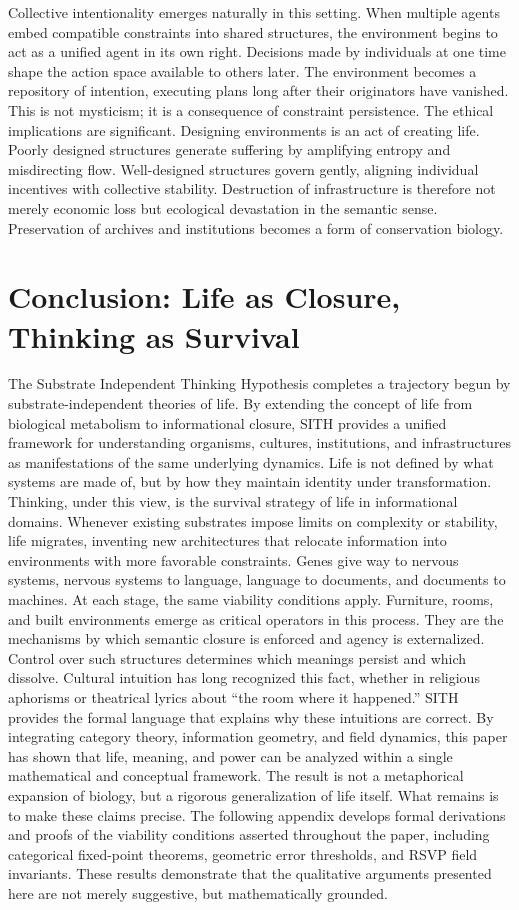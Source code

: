 \documentclass[11pt,oneside]{article}
\begin{document}
Collective intentionality emerges naturally in this setting. When multiple agents embed compatible constraints into shared structures, the environment begins to act as a unified agent in its own right. Decisions made by individuals at one time shape the action space available to others later. The environment becomes a repository of intention, executing plans long after their originators have vanished. This is not mysticism; it is a consequence of constraint persistence.
The ethical implications are significant. Designing environments is an act of creating life. Poorly designed structures generate suffering by amplifying entropy and misdirecting flow. Well-designed structures govern gently, aligning individual incentives with collective stability. Destruction of infrastructure is therefore not merely economic loss but ecological devastation in the semantic sense. Preservation of archives and institutions becomes a form of conservation biology.

\section{Conclusion: Life as Closure, Thinking as Survival}

The Substrate Independent Thinking Hypothesis completes a trajectory begun by substrate-independent theories of life. By extending the concept of life from biological metabolism to informational closure, SITH provides a unified framework for understanding organisms, cultures, institutions, and infrastructures as manifestations of the same underlying dynamics. Life is not defined by what systems are made of, but by how they maintain identity under transformation.
Thinking, under this view, is the survival strategy of life in informational domains. Whenever existing substrates impose limits on complexity or stability, life migrates, inventing new architectures that relocate information into environments with more favorable constraints. Genes give way to nervous systems, nervous systems to language, language to documents, and documents to machines. At each stage, the same viability conditions apply.
Furniture, rooms, and built environments emerge as critical operators in this process. They are the mechanisms by which semantic closure is enforced and agency is externalized. Control over such structures determines which meanings persist and which dissolve. Cultural intuition has long recognized this fact, whether in religious aphorisms or theatrical lyrics about “the room where it happened.” SITH provides the formal language that explains why these intuitions are correct.
By integrating category theory, information geometry, and field dynamics, this paper has shown that life, meaning, and power can be analyzed within a single mathematical and conceptual framework. The result is not a metaphorical expansion of biology, but a rigorous generalization of life itself.
What remains is to make these claims precise. The following appendix develops formal derivations and proofs of the viability conditions asserted throughout the paper, including categorical fixed-point theorems, geometric error thresholds, and RSVP field invariants. These results demonstrate that the qualitative arguments presented here are not merely suggestive, but mathematically grounded.
\end{document}
